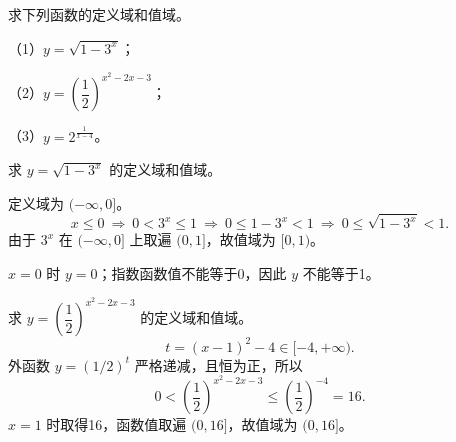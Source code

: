 \begin{frame}[t,label=A13q]
  求下列函数的定义域和值域。
  \par\vspace{0.2cm}
  （1）$y=\sqrt{1-3^x}$；
  \par\vspace{0.2cm}
  （2）$y=\left(\dfrac12\right)^{x^2-2x-3}$；
  \par\vspace{0.2cm}
  （3）$y=2^{\frac1{x-4}}$。
  \pause
  \Answer{（1）定义域 $(-\infty,0]$，值域 $[0,1)$；
  \par （2）定义域 $\mathbb R$，值域 $(0,16]$；
  \par （3）定义域 $(-\infty,4)\cup(4,+\infty)$，值域 $(0,1)\cup(1,+\infty)$。}
\end{frame}

\begin{frame}[t,label=A13a1]
  求 $y=\sqrt{1-3^x}$ 的定义域和值域。
  \pause
  \par 定义域为 $(-\infty,0]$。
  \[
    x\le0\ \Longrightarrow\ 0<3^x\le1
    \ \Longrightarrow\ 0\le1-3^x<1
    \ \Longrightarrow\ 0\le\sqrt{1-3^x}<1.
  \]
  由于 $3^x$ 在 $(-\infty,0]$ 上取遍 $(0,1]$，故值域为 $[0,1)$。
  \par $x=0$ 时 $y=0$；指数函数值不能等于0，因此 $y$ 不能等于1。
\end{frame}

\begin{frame}[t,label=A13a2]
  求 $y=\left(\dfrac12\right)^{x^2-2x-3}$ 的定义域和值域。
  \pause
  \[
    t=(x-1)^2-4\in[-4,+\infty).
  \]
  外函数 $y=(1/2)^t$ 严格递减，且恒为正，所以
  \[
    0<\left(\frac12\right)^{x^2-2x-3}
    \le\left(\frac12\right)^{-4}=16.
  \]
  $x=1$ 时取得16，函数值取遍 $(0,16]$，故值域为 $(0,16]$。
\end{frame}

